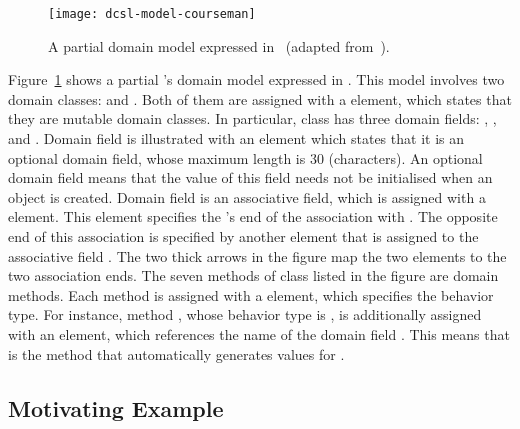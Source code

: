 \begin{figure}[ht]
	\centering
	\texttt{[image: dcsl-model-courseman]}
	\caption{A partial \courseman domain model expressed in \dcsl~(adapted from~\cite{le_domain_2018}).}
	\label{fig:dcsl_courseman}
\end{figure}

Figure~\ref{fig:dcsl_courseman} shows a partial \courseman's domain model expressed in \dcsl. This model involves two domain classes:  and . 
Both of them are assigned with a  element, which states that they are mutable domain classes. In particular, class  has three domain fields: , , and . Domain field  is illustrated with an  element which states that it is an optional domain field, whose maximum length is 30 (characters). An optional domain field means that the value of this field needs not be initialised when an object is created. Domain field  is an associative field, which is assigned with a  element. This element specifies the 's end of the association with . The opposite end of this association is specified by another  element that is assigned to the associative field . The two thick arrows in the figure map the two  elements to the two association ends. 
%
The seven methods of class  listed in the figure are domain methods. Each method is assigned with a  element, which specifies the behavior type. For instance, method , whose behavior type is , is additionally assigned with an  element, which references the name of the domain field . This means that  is the method that automatically generates values for .

\subsection{Motivating Example} 
\label{sect:bg-courseman-eg}

